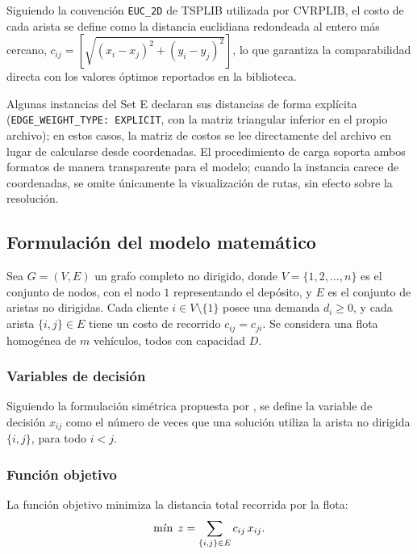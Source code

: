 Siguiendo la convención \texttt{EUC\_2D} de TSPLIB utilizada por CVRPLIB, el
costo de cada arista se define como la distancia euclidiana redondeada al
entero más cercano, $c_{ij} = \left[ \sqrt{(x_i-x_j)^2 + (y_i-y_j)^2} \right]$,
lo que garantiza la comparabilidad directa con los valores óptimos reportados
en la biblioteca.

Algunas instancias del Set E declaran sus distancias de forma explícita
(\texttt{EDGE\_WEIGHT\_TYPE: EXPLICIT}, con la matriz triangular inferior en el
propio archivo); en estos casos, la matriz de costos se lee directamente del
archivo en lugar de calcularse desde coordenadas. El procedimiento de carga
soporta ambos formatos de manera transparente para el modelo; cuando la
instancia carece de coordenadas, se omite únicamente la visualización de rutas,
sin efecto sobre la resolución.

\subsection{Formulación del modelo matemático}

Sea $G=(V,E)$ un grafo completo no dirigido, donde $V=\{1,2,\dots,n\}$ es el conjunto
de nodos, con el nodo $1$ representando el depósito, y $E$ es el conjunto de aristas no
dirigidas. Cada cliente $i\in V\setminus\{1\}$ posee una demanda $d_i \ge 0$, y cada
arista $\{i,j\}\in E$ tiene un costo de recorrido $c_{ij}=c_{ji}$. Se considera una
flota homogénea de $m$ vehículos, todos con capacidad $D$.

\subsubsection{Variables de decisión}

Siguiendo la formulación simétrica propuesta por \textcite{laporte1983branch}, se
define la variable de decisión $x_{ij}$ como el número de veces que una solución
utiliza la arista no dirigida $\{i,j\}$, para todo $i<j$.

\subsubsection{Función objetivo}

La función objetivo minimiza la distancia total recorrida por la flota:
\begin{equation}
    \operatorname*{m\acute{\imath}n} \; z = \sum_{\{i,j\} \in E} c_{ij}\, x_{ij}.
    \label{eq:metodo_objetivo}
\end{equation}

